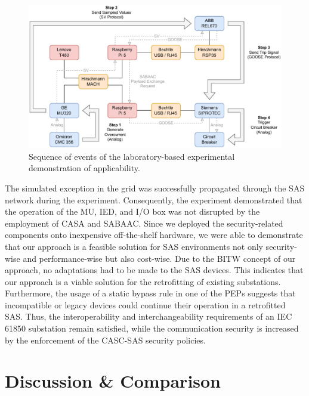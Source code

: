 \begin{figure}
    \centering
    \includegraphics[width=1.0\linewidth]{figures/lab_evaluation_steps.drawio.pdf}
    \caption{Sequence of events of the laboratory-based experimental demonstration of applicability.}
    \label{fig:lab_steps}
\end{figure}

The simulated exception in the grid was successfully propagated through the SAS network during the experiment.
Consequently, the experiment demonstrated that the operation of the MU, IED, and I/O box was not disrupted by the employment of CASA and SABAAC.
Since we deployed the security-related components onto inexpensive off-the-shelf hardware, we were able to demonstrate that our approach is a feasible solution for SAS environments not only security-wise and performance-wise but also cost-wise.
Due to the BITW concept of our approach, no adaptations had to be made to the SAS devices.
This indicates that our approach is a viable solution for the retrofitting of existing substations.
Furthermore, the usage of a static bypass rule in one of the PEPs suggests that incompatible or legacy devices could continue their operation in a retrofitted SAS.
Thus, the interoperability and interchangeability requirements of an IEC 61850 substation remain satisfied, while the communication security is increased by the enforcement of the CASC-SAS security policies.

\section{Discussion \& Comparison}
